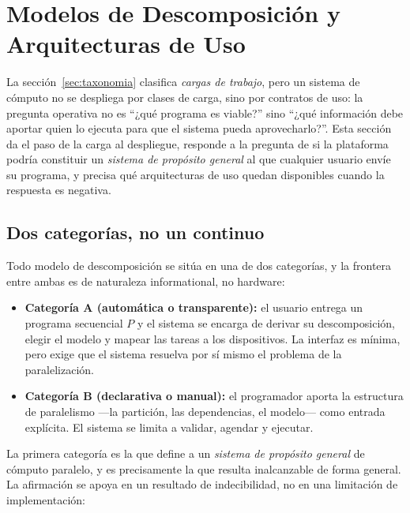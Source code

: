\documentclass[a4paper,11pt]{article}
\begin{document}
\section{Modelos de Descomposición y Arquitecturas de Uso}\label{sec:arquitecturas}

La sección~\ref{sec:taxonomia} clasifica \emph{cargas de trabajo}, pero un sistema de cómputo no se despliega por clases de carga, sino
por contratos de uso: la pregunta operativa no es ``¿qué programa es viable?'' sino ``¿qué información debe aportar quien lo ejecuta
para que el sistema pueda aprovecharlo?''. Esta sección da el paso de la carga al despliegue, responde a la pregunta de si la
plataforma podría constituir un \emph{sistema de propósito general} al que cualquier usuario envíe su programa, y precisa qué
arquitecturas de uso quedan disponibles cuando la respuesta es negativa.

\subsection*{Dos categorías, no un continuo}

Todo modelo de descomposición se sitúa en una de dos categorías, y la frontera entre ambas es de naturaleza informational, no
hardware:

\begin{itemize}[leftmargin=*,labelsep=0.5em,itemsep=0.8ex]
    \item \textbf{Categoría A (automática o transparente):} el usuario entrega un programa secuencial $P$ y el sistema se
    encarga de derivar su descomposición, elegir el modelo y mapear las tareas a los dispositivos. La interfaz es mínima, pero
    exige que el sistema resuelva por sí mismo el problema de la paralelización.
    \item \textbf{Categoría B (declarativa o manual):} el programador aporta la estructura de paralelismo ---la partición, las
    dependencias, el modelo--- como entrada explícita. El sistema se limita a validar, agendar y ejecutar.
\end{itemize}

La primera categoría es la que define a un \emph{sistema de propósito general} de cómputo paralelo, y es precisamente la que
resulta inalcanzable de forma general. La afirmación se apoya en un resultado de indecibilidad, no en una limitación de
implementación:
\end{document}
